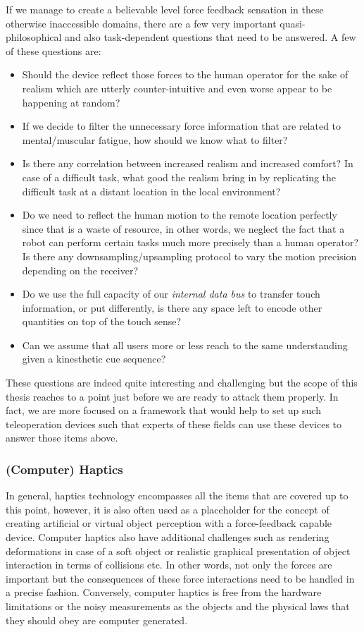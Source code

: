 If we manage to create a believable level force feedback sensation in these otherwise inaccessible domains, there are a few very important quasi-philosophical and also task-dependent questions that need to be answered. A few of these questions are:

\begin{itemize}
	\item Should the device reflect those forces to the human operator for the sake of realism which are utterly counter-intuitive and even worse appear to be happening at random? 
    \item If we decide to filter the unnecessary force information that are related to mental/muscular fatigue, how should we know what to filter? 
    \item Is there any correlation between increased realism and increased comfort? In case of a difficult task, what good the realism bring in by replicating the difficult task at a distant location in the local environment?
    \item Do we need to reflect the human motion to the remote location perfectly since that is a waste of resource, in other words, we neglect the fact that a robot can perform certain tasks much more precisely than a human operator? Is there any downsampling/upsampling protocol to vary the motion precision depending on the receiver?
    \item Do we use the full capacity of our \emph{internal data bus} to transfer touch information, or put differently, is there any space left to encode other quantities on top of the touch sense?
    \item Can we assume that all users more or less reach to the same understanding given a kinesthetic cue sequence?
\end{itemize}

These questions are indeed quite interesting and challenging but the scope of this thesis reaches to a point just before we are ready to attack them properly. In fact, we are more focused on a framework that would help to set up such teleoperation devices such that experts of these fields can use these devices to answer those items above. 

\subsubsection[Haptics]{(Computer) Haptics}
In general, haptics technology encompasses all the items that are covered up to this point, however, it is also often used as a placeholder for the concept of creating artificial or virtual object perception with a force-feedback capable device. Computer haptics also have additional challenges such as rendering deformations in case of a soft object or realistic graphical presentation of object interaction in terms of collisions etc. In other words, not only the forces are important but the consequences of these force interactions need to be handled in a precise fashion. Conversely, computer haptics is free from the hardware limitations or the noisy measurements as the objects and the physical laws that they should obey are computer generated. 

